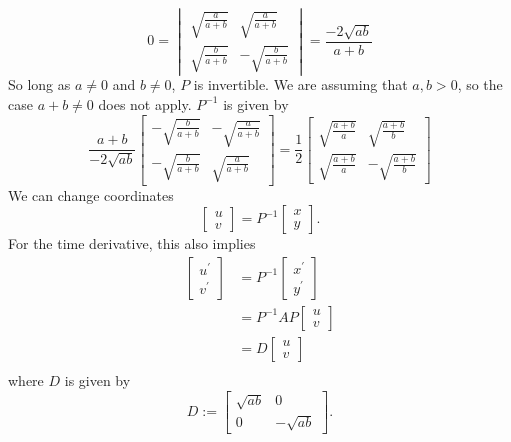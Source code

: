 \documentclass[12pt]{article}
\begin{document}
\begin{equation*}
  0=\begin{vmatrix}\sqrt{\frac{a}{a+b}} & \sqrt{\frac{a}{a+b}}\\
    \sqrt{\frac{b}{a+b}} & -\sqrt{\frac{b}{a+b}}
  \end{vmatrix} =\frac{-2\sqrt{ab}}{a+b}
\end{equation*}
So long as $a\neq0$ and $b\neq 0$, $P$ is invertible. We are assuming that $a,b>0$, so the case $a+b\neq0$ does not apply. $P^{-1}$ is given by
\[
  \frac{a+b}{-2\sqrt{ab}}
 \begin{bmatrix}
    -\sqrt{\frac{b}{a+b}} & -\sqrt{\frac{a}{a+b}}\\
    -\sqrt{\frac{b}{a+b}} & \sqrt{\frac{a}{a+b}}
  \end{bmatrix}
  =\frac{1}{2}\begin{bmatrix}
    \sqrt{\frac{a+b}{a}} & \sqrt{\frac{a+b}{b}}\\
    \sqrt{\frac{a+b}{a}} & -\sqrt{\frac{a+b}{b}}
  \end{bmatrix}
\]
We can change coordinates
\begin{equation*}
  \begin{bmatrix}u\\v\end{bmatrix}=P^{-1}\begin{bmatrix}x\\y\end{bmatrix}.
\end{equation*}
For the time derivative, this also implies
\begin{align*}
  \begin{bmatrix}
    u^\prime\\
    v^\prime
  \end{bmatrix}&=
  P^{-1}\begin{bmatrix}
    x^\prime\\y^\prime
  \end{bmatrix}\\
  &= P^{-1}AP\begin{bmatrix}
    u\\v 
  \end{bmatrix}\\
  &= D\begin{bmatrix}
    u\\v
  \end{bmatrix}\\
\end{align*}
where $D$ is given by
\begin{equation*}
  D:= \begin{bmatrix}\sqrt{ab} & 0 \\ 0 & -\sqrt{ab}\end{bmatrix}.
\end{equation*}
\end{document}

